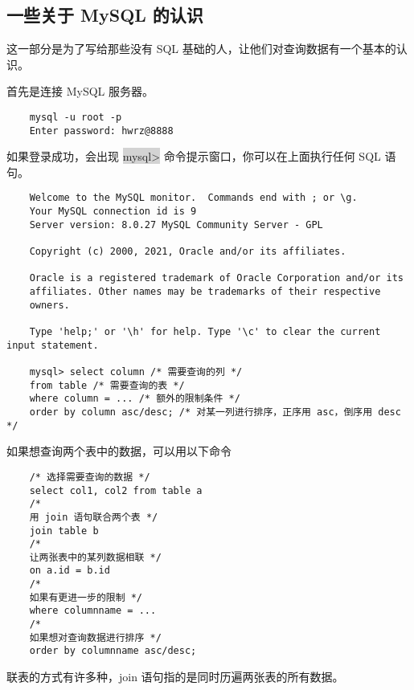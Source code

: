 \documentclass[H:\workspace\实习日志\ShixiRizhi.tex]{subfiles}
\begin{document}
\subsection{一些关于 MySQL 的认识}
这一部分是为了写给那些没有 SQL 基础的人，让他们对查询数据有一个基本的认识。\par 

首先是连接 MySQL 服务器。
\lstset{style=mystyle,language=SQL}
\begin{lstlisting}
    mysql -u root -p
    Enter password: hwrz@8888 
\end{lstlisting}

如果登录成功，会出现 \colorbox{lightgray}{mysql>} 命令提示窗口，你可以在上面执行任何 SQL 语句。
\begin{lstlisting}
    Welcome to the MySQL monitor.  Commands end with ; or \g.
    Your MySQL connection id is 9
    Server version: 8.0.27 MySQL Community Server - GPL
    
    Copyright (c) 2000, 2021, Oracle and/or its affiliates.
    
    Oracle is a registered trademark of Oracle Corporation and/or its
    affiliates. Other names may be trademarks of their respective
    owners.
    
    Type 'help;' or '\h' for help. Type '\c' to clear the current input statement.
    
    mysql> select column /* 需要查询的列 */
    from table /* 需要查询的表 */
    where column = ... /* 额外的限制条件 */
    order by column asc/desc; /* 对某一列进行排序，正序用 asc，倒序用 desc */
\end{lstlisting}

如果想查询两个表中的数据，可以用以下命令
\begin{lstlisting}
    /* 选择需要查询的数据 */
    select col1, col2 from table a
    /* 
    用 join 语句联合两个表 */
    join table b
    /* 
    让两张表中的某列数据相联 */
    on a.id = b.id
    /* 
    如果有更进一步的限制 */
    where columnname = ...
    /* 
    如果想对查询数据进行排序 */
    order by columnname asc/desc;
\end{lstlisting}
联表的方式有许多种，join 语句指的是同时历遍两张表的所有数据。
\end{document}

